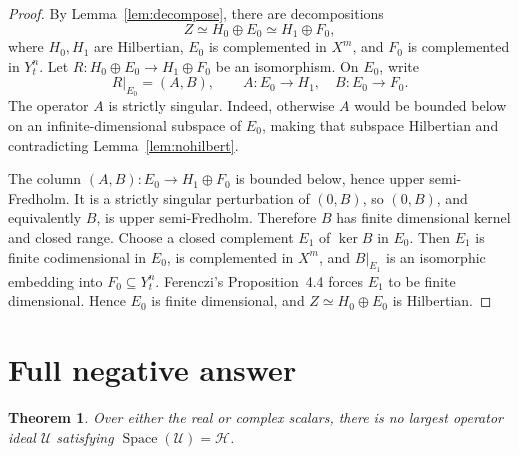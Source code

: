 \documentclass[11pt]{article}
\newtheorem{theorem}{Theorem}
\newcommand{\Space}{\operatorname{Space}}
\newcommand{\cH}{\mathcal H}
\begin{document}
\begin{proof}
By Lemma~\ref{lem:decompose}, there are decompositions
\[
 Z\simeq H_0\oplus E_0\simeq H_1\oplus F_0,
\]
where $H_0,H_1$ are Hilbertian, $E_0$ is complemented in $X^m$, and $F_0$
is complemented in $Y_t^n$. Let
$R:H_0\oplus E_0\to H_1\oplus F_0$ be an isomorphism. On $E_0$, write
\[
 R|_{E_0}=(A,B),\qquad A:E_0\to H_1,\quad B:E_0\to F_0.
\]
The operator $A$ is strictly singular. Indeed, otherwise $A$ would be
bounded below on an infinite-dimensional subspace of $E_0$, making that
subspace Hilbertian and contradicting Lemma~\ref{lem:nohilbert}.

The column $(A,B):E_0\to H_1\oplus F_0$ is bounded below, hence upper
semi-Fredholm. It is a strictly singular perturbation of $(0,B)$, so $(0,B)$,
and equivalently $B$, is upper semi-Fredholm. Therefore $B$ has finite
dimensional kernel and closed range. Choose a closed complement $E_1$ of
$\ker B$ in $E_0$. Then $E_1$ is finite codimensional in $E_0$, is
complemented in $X^m$, and $B|_{E_1}$ is an isomorphic embedding into
$F_0\subseteq Y_t^n$. Ferenczi's Proposition~4.4 forces $E_1$ to be finite
dimensional. Hence $E_0$ is finite dimensional, and
$Z\simeq H_0\oplus E_0$ is Hilbertian.
\end{proof}

\section{Full negative answer}

\begin{theorem}\label{thm:main}
Over either the real or complex scalars, there is no largest operator ideal
$\mathcal U$ satisfying $\Space(\mathcal U)=\cH$.
\end{theorem}
\end{document}
